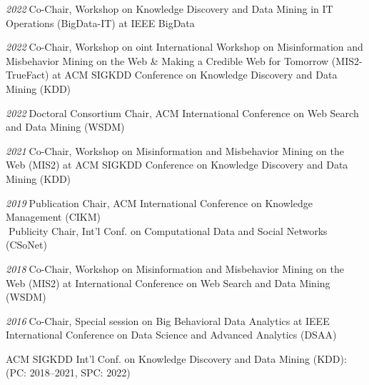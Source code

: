 \documentclass[10pt]{article}
\newenvironment{myindentpar}[1]%
{\begin{list}{}%
         {\setlength{\leftmargin}{#1}}%
         \item[]%
}
{\end{list}}
\newcounter{list}
\begin{document}
\begin{myindentpar}{0.75cm}

\hspace{-0.75cm}{\bf Organizing Committee}

{\small

\hspace{-0.75cm}\textit{2022}\textcolor{white}{.}Co-Chair, Workshop on Knowledge Discovery and Data Mining in IT Operations (BigData-IT) at IEEE BigData

\hspace{-0.75cm}\textit{2022}\textcolor{white}{.}Co-Chair, Workshop on oint International Workshop on Misinformation and Misbehavior Mining on the Web \& Making a Credible Web for Tomorrow (MIS2-TrueFact) at ACM SIGKDD Conference on Knowledge Discovery and Data Mining (KDD)

\hspace{-0.75cm}\textit{2022}\textcolor{white}{.}Doctoral Consortium Chair, ACM International Conference on Web Search and Data Mining (WSDM)

\hspace{-0.75cm}\textit{2021}\textcolor{white}{.}Co-Chair, Workshop on Misinformation and Misbehavior Mining on the Web (MIS2) at ACM SIGKDD Conference on Knowledge Discovery and Data Mining (KDD)

\hspace{-0.75cm}\textit{2019}\textcolor{white}{.}Publication Chair, ACM International Conference on Knowledge Management (CIKM) \\
\textcolor{white}{.}Publicity Chair, Int'l Conf. on Computational Data and Social Networks (CSoNet)

\hspace{-0.75cm}\textit{2018}\textcolor{white}{.}Co-Chair, Workshop on Misinformation and Misbehavior Mining on the Web (MIS2) at International Conference on Web Search and Data Mining (WSDM)

\hspace{-0.75cm}\textit{2016}\textcolor{white}{.}Co-Chair, Special session on Big Behavioral Data Analytics at IEEE International Conference on Data Science and Advanced Analytics (DSAA)

}

\hspace{-0.75cm}{\bf (Senior) Program Committee / Reviewer / (Senior) Area Chair}

{\small

\hspace{-0.75cm}ACM SIGKDD Int'l Conf. on Knowledge Discovery and Data Mining (KDD): \\
(PC: 2018--2021, SPC: 2022)

}
\end{myindentpar}
\end{document}
